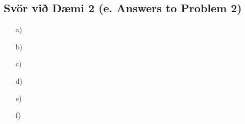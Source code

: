 \subsection*{Svör við Dæmi 2 (e. Answers to Problem 2)}
\vspace{0.5cm}
\begin{multicols}{2}
\begin{itemize}
    \item [a)] \fillin[7cm]{
  
    }     
    \newline
    \item [b)] \fillin[7cm]{
  
    } 
    \newline
    \item [c)] \fillin[7cm]{
  
    }  
    \newline
    \item [d)] \fillin[7cm]{
    
    }  
    \newline
    \item [e)] \fillin[7cm]{
  
    }  
    \newline
    \item [f)] \fillin[7cm]{
  
    }  
    \newline   
\end{itemize}
\end{multicols}
